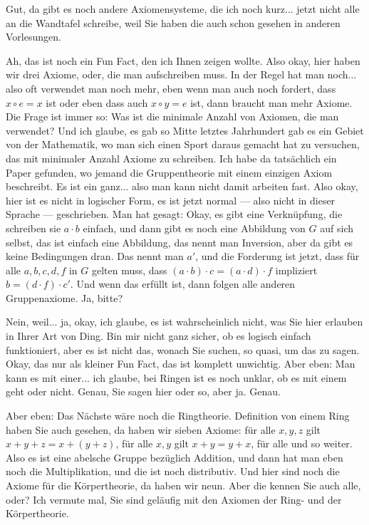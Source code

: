 \begin{spoken-clean}[01:26:12 - 01:29:18]
Gut, da gibt es noch andere Axiomensysteme, die ich noch kurz... jetzt nicht alle an die Wandtafel schreibe, weil Sie haben die auch schon gesehen in anderen Vorlesungen.


Ah, das ist noch ein Fun Fact, den ich Ihnen zeigen wollte. Also okay, hier haben wir drei Axiome, oder, die man aufschreiben muss. In der Regel hat man noch... also oft verwendet man noch mehr, eben wenn man auch noch fordert, dass $x \circ e = x$ ist oder eben dass auch $x \circ y = e$ ist, dann braucht man mehr Axiome. Die Frage ist immer so: Was ist die minimale Anzahl von Axiomen, die man verwendet? Und ich glaube, es gab so Mitte letztes Jahrhundert gab es ein Gebiet von der Mathematik, wo man sich einen Sport daraus gemacht hat zu versuchen, das mit minimaler Anzahl Axiome zu schreiben. Ich habe da tatsächlich ein Paper gefunden, wo jemand die Gruppentheorie mit einem einzigen Axiom beschreibt. Es ist ein ganz... also man kann nicht damit arbeiten fast. Also okay, hier ist es nicht in logischer Form, es ist jetzt normal --- also nicht in dieser Sprache --- geschrieben. Man hat gesagt: Okay, es gibt eine Verknüpfung, die schreiben sie $a \cdot b$ einfach, und dann gibt es noch eine Abbildung von $G$ auf sich selbst, das ist einfach eine Abbildung, das nennt man Inversion, aber da gibt es keine Bedingungen dran. Das nennt man $a'$, und die Forderung ist jetzt, dass für alle $a, b, c, d, f$ in $G$ gelten muss, dass $(a \cdot b) \cdot c = (a \cdot d) \cdot f$ impliziert $b = (d \cdot f) \cdot c'$. Und wenn das erfüllt ist, dann folgen alle anderen Gruppenaxiome. Ja, bitte?


Nein, weil... ja, okay, ich glaube, es ist wahrscheinlich nicht, was Sie hier erlauben in Ihrer Art von Ding. Bin mir nicht ganz sicher, ob es logisch einfach funktioniert, aber es ist nicht das, wonach Sie suchen, so quasi, um das zu sagen. Okay, das nur als kleiner Fun Fact, das ist komplett unwichtig. Aber eben: Man kann es mit einer... ich glaube, bei Ringen ist es noch unklar, ob es mit einem geht oder nicht. Genau, Sie sagen hier  oder so, aber ja. Genau.

Aber eben: Das Nächste wäre noch die Ringtheorie. Definition von einem Ring haben Sie auch gesehen, da haben wir sieben Axiome: für alle $x, y, z$ gilt $x+y+z = x+(y+z)$, für alle $x, y$ gilt $x+y = y+x$, für alle und so weiter. Also es ist eine abelsche Gruppe bezüglich Addition, und dann hat man eben noch die Multiplikation, und die ist noch distributiv. Und hier sind noch die Axiome für die Körpertheorie, da haben wir neun. Aber die kennen Sie auch alle, oder? Ich vermute mal, Sie sind geläufig mit den Axiomen der Ring- und der Körpertheorie.
\end{spoken-clean}

